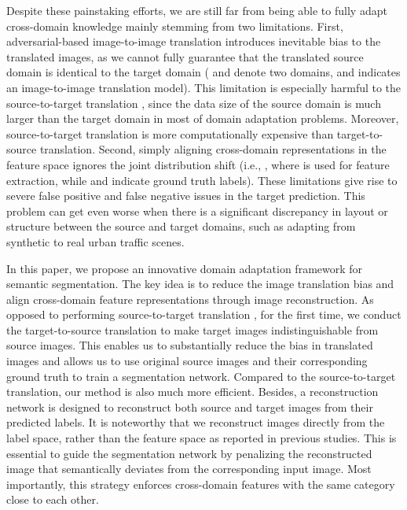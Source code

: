 \documentclass[runningheads]{llncs}
\begin{document}
	Despite these painstaking efforts, we are still far from being able to fully adapt cross-domain knowledge mainly stemming from two limitations. First, adversarial-based image-to-image translation introduces inevitable bias to the translated images, as we cannot fully guarantee that the translated source domain  is identical to the target domain  ( and  denote two domains, and  indicates an image-to-image translation model). This limitation is especially harmful to the source-to-target translation \cite{zhang2018fully,hoffman2017cycada,wu2018dcan,murez2018image,li2019bidirectional}, since the data size of the source domain is much larger than the target domain in most of domain adaptation problems. Moreover, source-to-target translation is more computationally expensive than target-to-source translation. Second, simply aligning cross-domain representations in the feature space \cite{hoffman2016fcns,hoffman2017cycada,tsai2018learning} ignores the joint distribution shift (i.e., , where  is used for feature extraction, while  and  indicate ground truth labels). These limitations give rise to severe false positive and false negative issues in the target prediction. This problem can get even worse when there is a significant discrepancy in layout or structure between the source and target domains, such as adapting from synthetic to real urban traffic scenes.
	
	In this paper, we propose an innovative domain adaptation framework for semantic segmentation. The key idea is to reduce the image translation bias and align cross-domain feature representations through image reconstruction. As opposed to performing source-to-target translation \cite{hoffman2017cycada,wu2018dcan,li2019bidirectional}, for the first time, we conduct the target-to-source translation to make target images indistinguishable from source images. This enables us to substantially reduce the bias in translated images and allows us to use original source images and their corresponding ground truth to train a segmentation network. Compared to the source-to-target translation, our method is also much more efficient. Besides, a reconstruction network is designed to reconstruct both source and target images from their predicted labels. It is noteworthy that we reconstruct images directly from the label space, rather than the feature space as reported in previous studies. This is essential to guide the segmentation network by penalizing the reconstructed image that semantically deviates from the corresponding input image. Most importantly, this strategy enforces cross-domain features with the same category close to each other.
	
\end{document}
